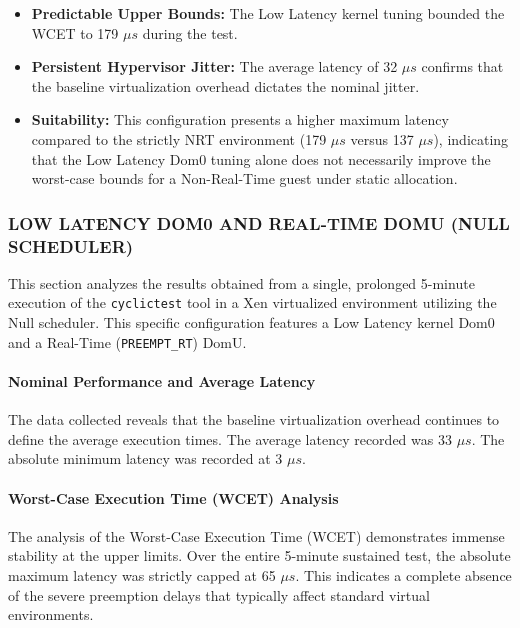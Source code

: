 \begin{itemize}
\item
  \textbf{Predictable Upper Bounds:} The Low Latency kernel tuning
  bounded the WCET to 179 $\mu s$ during the test.
\item
  \textbf{Persistent Hypervisor Jitter:} The average latency of 32 $\mu s$
  confirms that the baseline virtualization overhead dictates the
  nominal jitter.
\item
  \textbf{Suitability:} This configuration presents a higher maximum
  latency compared to the strictly NRT environment (179 $\mu s$ versus 137
  $\mu s$), indicating that the Low Latency Dom0 tuning alone does not
  necessarily improve the worst-case bounds for a Non-Real-Time guest
  under static allocation.
\end{itemize}

\subsubsection{LOW LATENCY DOM0 AND REAL-TIME DOMU (NULL
SCHEDULER)}\label{low-latency-dom0-and-real-time-domu-null-scheduler}

This section analyzes the results obtained from a single, prolonged
5-minute execution of the \texttt{cyclictest} tool in a Xen virtualized
environment utilizing the Null scheduler. This specific configuration
features a Low Latency kernel Dom0 and a Real-Time
(\texttt{PREEMPT\_RT}) DomU.

\paragraph{Nominal Performance and Average
Latency}\label{nominal-performance-and-average-latency-18}

The data collected reveals that the baseline virtualization overhead
continues to define the average execution times. The average latency
recorded was 33 $\mu s$. The absolute minimum latency was recorded at 3 $\mu s$.

\paragraph{Worst-Case Execution Time (WCET)
Analysis}\label{worst-case-execution-time-wcet-analysis-20}

The analysis of the Worst-Case Execution Time (WCET) demonstrates
immense stability at the upper limits. Over the entire 5-minute
sustained test, the absolute maximum latency was strictly capped at 65
$\mu s$. This indicates a complete absence of the severe preemption delays
that typically affect standard virtual environments.

